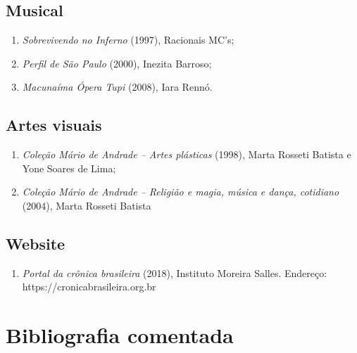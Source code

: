 \documentclass[12pt]{extarticle}
\begin{document}
\subsection{Musical}

\begin{enumerate}
\item
  \emph{Sobrevivendo no Inferno} (1997), Racionais MC's;
\item
  \emph{Perfil de São Paulo} (2000), Inezita Barroso;
\item
  \emph{Macunaíma Ópera Tupi} (2008), Iara Rennó.
\end{enumerate}

\subsection{Artes visuais}

\begin{enumerate}
\item
  \emph{Coleção Mário de Andrade -- Artes plásticas} (1998), Marta
  Rosseti Batista e Yone Soares de Lima;
\item
  \emph{Coleção Mário de Andrade -- Religião e magia, música e dança,
  cotidiano} (2004), Marta Rosseti Batista
\end{enumerate}

\subsection{Website}

\begin{enumerate}
\item
  \emph{Portal da crônica brasileira} (2018), Instituto Moreira Salles.
  Endereço: https://cronicabrasileira.org.br
\end{enumerate}

\section{Bibliografia comentada}
\end{document}

